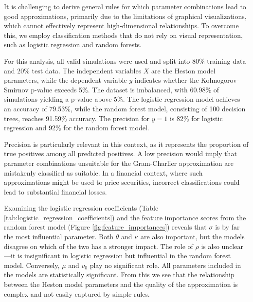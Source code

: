 It is challenging to derive general rules for which parameter combinations lead to good approximations, primarily due to the limitations of graphical visualizations, which cannot effectively represent high-dimensional relationships. To overcome this, we employ classification methods that do not rely on visual representation, such as logistic regression and random forests.

For this analysis, all valid simulations were used and split into 80\% training data and 20\% test data. The independent variables $X$ are the Heston model parameters, while the dependent variable $y$ indicates whether the Kolmogorov-Smirnov p-value exceeds 5\%. The dataset is imbalanced, with 60.98\% of simulations yielding a p-value above 5\%. The logistic regression model achieves an accuracy of 79.53\%, while the random forest model, consisting of 100 decision trees, reaches 91.59\% accuracy. The precision for $y = 1$ is 82\% for logistic regression and 92\% for the random forest model.

Precision is particularly relevant in this context, as it represents the proportion of true positives among all predicted positives. A low precision would imply that parameter combinations unsuitable for the Gram-Charlier approximation are mistakenly classified as suitable. In a financial context, where such approximations might be used to price securities, incorrect classifications could lead to substantial financial losses.

Examining the logistic regression coefficients (Table \ref{tab:logistic_regression_coefficients}) and the feature importance scores from the random forest model (Figure \ref{fig:feature_importances}) reveals that $\sigma$ is by far the most influential parameter. Both $\theta$ and $\kappa$ are also important, but the models disagree on which of the two has a stronger impact. The role of $\rho$ is also unclear—it is insignificant in logistic regression but influential in the random forest model. Conversely, $\mu$ and $v_0$ play no significant role. All parameters included in the models are statistically significant. From this we see that the relationship between the Heston model parameters and the quality of the approximation is complex and not easily captured by simple rules.


